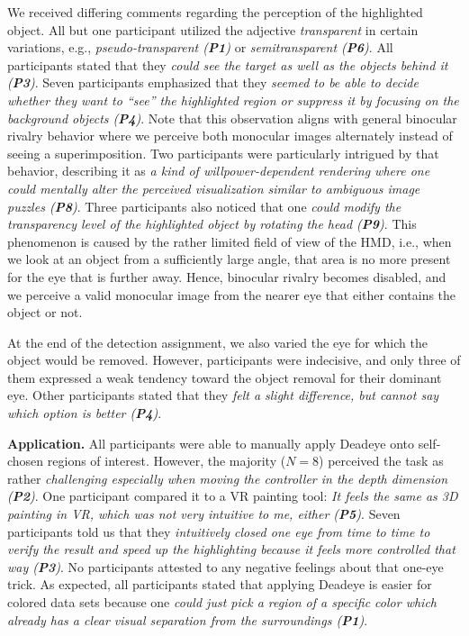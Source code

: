 \documentclass[journal]{vgtc}                %
\begin{document}
We received differing comments regarding the perception of the highlighted object. All but one participant utilized the adjective \textit{transparent} in certain variations, e.g., \textit{pseudo-transparent (\textbf{P1})} or \textit{semitransparent (\textbf{P6})}. All participants stated that they \textit{could see the target as well as the objects behind it (\textbf{P3})}. Seven participants emphasized that they \textit{seemed to be able to decide whether they want to ``see'' the highlighted region or suppress it by focusing on the background objects (\textbf{P4})}. Note that this observation aligns with general binocular rivalry behavior where we perceive both monocular images alternately instead of seeing a superimposition. Two participants were particularly intrigued by that behavior, describing it as \textit{a kind of willpower-dependent rendering where one could mentally alter the perceived visualization similar to ambiguous image puzzles (\textbf{P8})}. Three participants also noticed that one \textit{could modify the transparency level of the highlighted object by rotating the head (\textbf{P9})}. This phenomenon is caused by the rather limited field of view of the HMD, i.e., when we look at an object from a sufficiently large angle, that area is no more present for the eye that is further away. Hence, binocular rivalry becomes disabled, and we perceive a valid monocular image from the nearer eye that either contains the object or not.

At the end of the detection assignment, we also varied the eye for which the object would be removed. However, participants were indecisive, and only three of them expressed a weak tendency toward the object removal for their dominant eye. Other participants stated that they \textit{felt a slight difference, but cannot say which option is better (\textbf{P4})}. 



\textbf{Application.} All participants were able to manually apply Deadeye onto self-chosen regions of interest. However, the majority ($N = 8$) perceived the task as rather \textit{challenging especially when moving the controller in the depth dimension (\textbf{P2})}. One participant compared it to a VR painting tool: \textit{It feels the same as 3D painting in VR, which was not very intuitive to me, either (\textbf{P5})}. Seven participants told us that they \textit{intuitively closed one eye from time to time to verify the result and speed up the highlighting because it feels more controlled that way (\textbf{P3})}. No participants attested to any negative feelings about that one-eye trick. As expected, all participants stated that applying Deadeye is easier for colored data sets because one \textit{could just pick a region of a specific color which already has a clear visual separation from the surroundings (\textbf{P1})}. 
\end{document}
